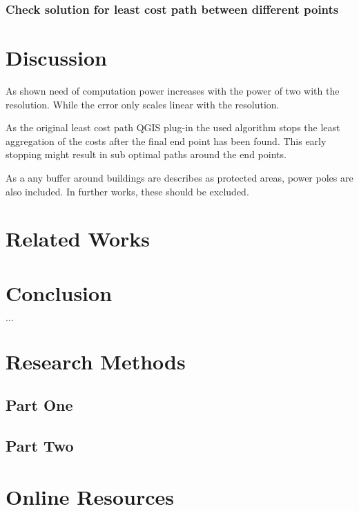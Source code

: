 \documentclass[acmtog]{acmart}
\begin{document}
	\subsubsection{Check solution for least cost path between different points}
	
	\section{Discussion}\label{sec:discussion}
	As shown need of computation power increases with the power of two with the resolution.
	While the error only scales linear with the resolution.
	
	As the original least cost path QGIS plug-in the used algorithm stops the least aggregation of the costs after the final end point has been found.
	This early stopping might result in sub optimal paths around the end points.
	
	As a any buffer around buildings are describes as protected areas, power poles are also included.
	In further works, these should be excluded.
	
	\section{Related Works}\label{sec:related-works}


	\section{Conclusion}\label{sec:conclusion}



\begin{acks}
	$\ldots$
\end{acks}





\appendix

\section{Research Methods}\label{sec:research-methods}

	\subsection{Part One}\label{subsec:part-one}

	\subsection{Part Two}\label{subsec:part-two}


	\section{Online Resources}\label{sec:online-resources}
\end{document}
